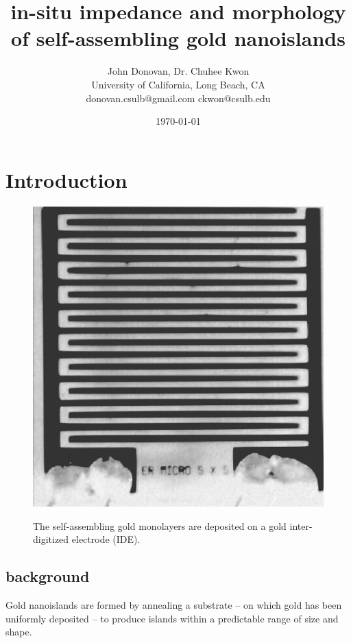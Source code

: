 \documentclass[12pt,oneside,english]{article}
\begin{document}
\sffamily

        \title{in-situ impedance and morphology of self-assembling gold nanoislands}

	\author{John Donovan, Dr. Chuhee Kwon\\
	University of California, Long Beach, CA\\
	{\small donovan.csulb@gmail.com ckwon@csulb.edu}}
	
        \date{\today}

	\maketitle


        \section{Introduction}

	\begin{figure}
	\includegraphics[scale=0.4]{images/IDE.eps} \label{f:IDE}
	\caption{The self-assembling gold monolayers are deposited on a gold inter-digitized electrode (IDE).}
	\end{figure}
	
	\subsection{background}
	Gold nanoislands  are formed by annealing a substrate -- on which gold has been uniformly deposited -- to produce islands within a predictable range of size and shape.
	
\end{document}
